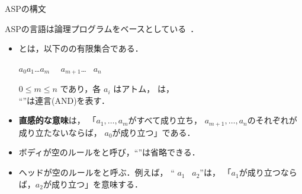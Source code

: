 \documentclass[dvipdfmx, 11pt]{beamer}
\begin{document}
\begin{frame}{ASPの構文}
  \begin{alertblock}{}\centering
    ASPの言語は論理プログラムをベースとしている~\footnotemark[1]．
  \end{alertblock}
  \begin{itemize}
  \item {}とは，以下のの有限集合である．
    \begin{center}
      \begin{minipage}[c]{0.7\textwidth}
        \begin{block}{}\centering
          $a_0$\quad\code{:-}\quad$a_1$\code{,}\ldots\code{,}$a_m$\code{,}
          \ ~$a_{m+1}$\code{,}\ldots\code{,} ~$a_n$
        \end{block}        
      \end{minipage}
   \end{center}\vfill
    $0 \leq m \leq n$ であり，各 $a_i$ はアトム，
    は，\\
    ``\code{,}''は連言(AND)を表す．
  \item \alert{\bf 直感的な意味}は，
    「$a_1,\ldots,a_m$がすべて成り立ち，
    $a_{m+1},\ldots,a_n$のそれぞれが成り立たないならば，
    $a_0$が成り立つ」である．
  \item ボディが空のルールをと呼び，``\code{:-}''は省略できる．
  \item ヘッドが空のルールをと呼ぶ．例えば，
    ``\code{:-} $a_1$\code{,} ~$a_{2}$''は，
    「$a_1$が成り立つならば，$a_2$が成り立つ」を意味する．
  \end{itemize}
\end{frame}
\end{document}
